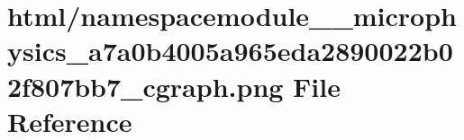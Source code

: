 \hypertarget{namespacemodule____microphysics__a7a0b4005a965eda2890022b02f807bb7__cgraph_8png}{}\section{html/namespacemodule\+\_\+\+\_\+microphysics\+\_\+a7a0b4005a965eda2890022b02f807bb7\+\_\+cgraph.png File Reference}
\label{namespacemodule____microphysics__a7a0b4005a965eda2890022b02f807bb7__cgraph_8png}
